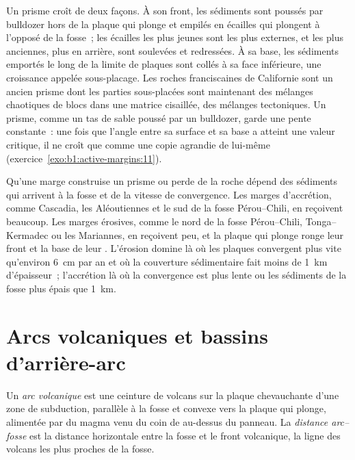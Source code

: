 Un prisme croît de deux façons. À son front, les sédiments sont poussés par bulldozer hors de la
plaque qui plonge et empilés en écailles qui plongent à l'opposé de la fosse~; les
écailles les plus jeunes sont les plus externes, et les plus anciennes, plus en arrière, sont soulevées
et redressées. À sa base, les sédiments emportés le long de la limite de plaques
sont collés à sa face inférieure, une croissance appelée sous-placage. Les roches franciscaines
de Californie sont un ancien prisme dont les parties sous-placées sont maintenant des
mélanges chaotiques de blocs dans une matrice cisaillée, des mélanges tectoniques. Un prisme, comme un tas de sable
poussé par un bulldozer, garde une pente constante~: une fois que l'angle entre sa
surface et sa base a atteint une valeur critique, il ne croît que comme une copie
agrandie de lui-même (exercice~\ref{exo:b1:active-margins:11}).

Qu'une marge construise un prisme ou perde de la roche dépend des sédiments qui
arrivent à la fosse et de la vitesse de convergence. Les marges d'accrétion, comme
Cascadia, les Aléoutiennes et le sud de la fosse Pérou--Chili, en reçoivent
beaucoup. Les marges érosives, comme le nord de la fosse Pérou--Chili,
Tonga--Kermadec ou les Mariannes, en reçoivent peu, et la plaque qui plonge ronge
leur front et la base de leur . L'érosion domine là où les plaques
convergent plus vite qu'environ \qty{6}{cm} par an et où la couverture sédimentaire fait moins
de \qty{1}{km} d'épaisseur~; l'accrétion là où la convergence est plus lente ou
les sédiments de la fosse plus épais que \qty{1}{km}.

\section{Arcs volcaniques et bassins d'arrière-arc}\label{sec:b1:active-margins:arcs}

\begin{definition}\label{def:b1:active-margins:volcanic-arc}
Un \emph{arc volcanique} est une ceinture de volcans sur la
plaque chevauchante d'une zone de subduction, parallèle à la fosse et convexe
vers la plaque qui plonge, alimentée par du magma venu du coin de  au-dessus du panneau.
La \emph{distance arc--fosse} est la distance horizontale
entre la fosse et le front volcanique, la ligne des volcans les plus proches
de la fosse.
\end{definition}

